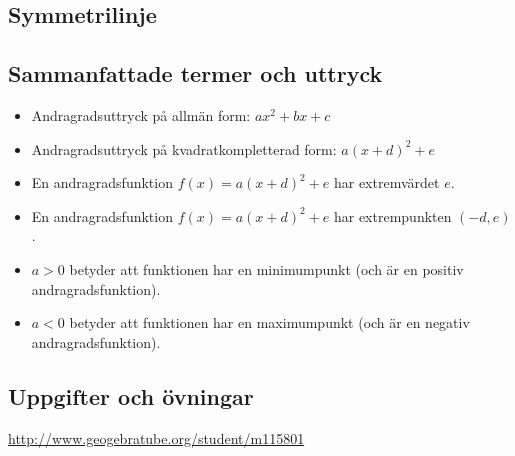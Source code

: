 \subsection{Symmetrilinje}



\subsection{Sammanfattade termer och uttryck}

\begin{itemize}
  \item Andragradsuttryck på allmän form: $ax^2+bx+c$
  \item Andragradsuttryck på kvadratkompletterad form: $a(x+d)^2+e$
  \item En andragradsfunktion $f(x)=a(x+d)^2+e$ har extremvärdet $e$.
  \item En andragradsfunktion $f(x)=a(x+d)^2+e$ har extrempunkten $(-d, e)$.
  \item $a > 0$ betyder att funktionen har en minimumpunkt (och är en positiv andragradsfunktion).
  \item $a < 0$ betyder att funktionen har en maximumpunkt (och är en negativ andragradsfunktion).
\end{itemize}

\subsection{Uppgifter och övningar}

\url{http://www.geogebratube.org/student/m115801}
